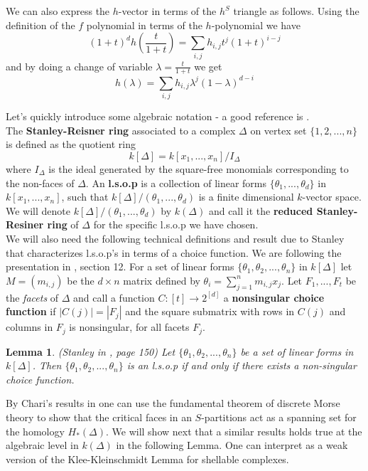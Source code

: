 \documentclass[a4paper]{article}
\newtheorem{lemma}[theorem]{Lemma}
\begin{document}
{We can also express the $h$-vector in terms of the $h^S$ triangle as follows. Using the definition of the $f$ polynomial in terms of the $h$-polynomial we have $$(1+t)^d h(\frac{t}{1+t}) = \sum_{i,j}h_{i,j}t^j(1+t)^{i-j}$$ and by doing a change of variable $\lambda = \frac{t}{1+t}$ we get $$h(\lambda) = \sum_{i,j}h_{i,j} \lambda^j (1-\lambda)^{d-i} $$

Let's quickly introduce some algebraic notation - a good reference is \cite{facesurvey}. \\
	The \textbf{Stanley-Reisner ring} associated to a complex $\Delta$ on vertex set $\{1,2,...,n\}$ is defined as the quotient ring 
$$k[\Delta] = k[x_1,...,x_n]/ I_{\Delta}$$ 
where $I_{\Delta}$ is the ideal generated by the square-free monomials corresponding to the non-faces of $\Delta$. An \textbf{l.s.o.p} is a collection of linear forms $\{ \theta_1,...,\theta_d\}$ in $k[x_1,...,x_n]$,  such that $k[\Delta]/(\theta_1,...,\theta_d)$ is a finite dimensional $k$-vector space. 
We will denote $k[\Delta]/(\theta_1,...,\theta_d)$ by $k(\Delta)$ and call it the \textbf{reduced Stanley-Resiner ring} of $\Delta$ for the specific l.s.o.p we have chosen. \\

We will also need the following technical definitions and result due to Stanley that characterizes l.s.o.p's in terms of a choice function. We are following the presentation in \cite{nonpure2}, section 12. For a set of linear forms $\{\theta_1, \theta_2,...,\theta_n\}$ in $k[\Delta]$ let $M = (m_{i,j})$ be the $d \times n$ matrix defined by $\theta_i = \sum\limits_{j=1}^n m_{i,j}x_j$. Let $F_1,..., F_t$ be the \textit{facets} of $\Delta$ and call a function $C: [t] \rightarrow 2^{[d]}$ a \textbf{nonsingular choice function} if $|C(j)| = |F_j|$ and the square
submatrix with rows in $C(j)$ and columns in $F_j$ is nonsingular, for all facets $F_j$.

\begin{lemma}(Stanley in \cite{stanley}, page 150)
Let $\{\theta_1, \theta_2,...,\theta_n\}$ be a set of linear forms in $k[\Delta]$. Then $\{\theta_1, \theta_2,...,\theta_n\}$ is an l.s.o.p if and only if there exists a non-singular choice function.
\end{lemma}

By Chari's results in \cite{chari_morse} one can use the fundamental theorem of discrete Morse theory to show that the critical faces in an $S$-partitions act as a spanning set for the homology $H_*(\Delta)$. We will show next that a similar results holds true at the algebraic level in $k(\Delta)$ in the following Lemma. One can interpret as a weak version of the Klee-Kleinschmidt Lemma for shellable complexes. \\

}
\end{document}
